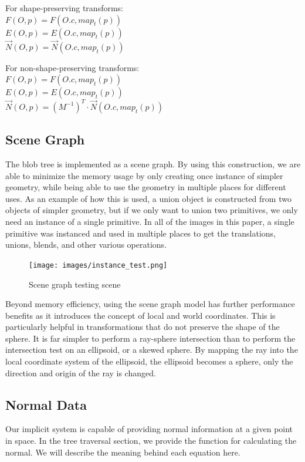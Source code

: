 \documentclass[conference]{acmsiggraph}
\begin{document}
For shape-preserving transforms:\\
$F(O, p) = F(O.c, map_t(p))$\\
$E(O, p) = E(O.c, map_t(p))$\\
$\overrightarrow{N}(O, p) = \overrightarrow{N}(O.c, map_t(p))$

For non-shape-preserving transforms:\\
$F(O, p) = F(O.c, map_t(p))$\\
$E(O, p) = E(O.c, map_t(p))$\\
$\overrightarrow{N}(O, p) = (M^{-1})^T \cdot \overrightarrow{N}(O.c, map_t(p))$

\subsection{Scene Graph}
The blob tree is implemented as a scene graph. By using this construction, we
are able to minimize the memory usage by only creating once instance of simpler
geometry, while being able to use the geometry in multiple places for different
uses. As an example of how this is used, a union object is constructed from two
objects of simpler geometry, but if we only want to union two primitives, we
only need an instance of a single primitive. In all of the images in this
paper, a single primitive was instanced and used in multiple places to get the
translations, unions, blends, and other various operations.

\begin{figure}[htbp]
	\texttt{[image: images/instance\_test.png]}
	\caption{Scene graph testing scene}
	\label{fig:Scenegraph}
\end{figure}

Beyond memory efficiency, using the scene graph model has further performance
benefits as it introduces the concept of local and world coordinates. This is
particularly helpful in transformations that do not preserve the shape of the
sphere. It is far simpler to perform a ray-sphere intersection than to perform
the intersection test on an ellipsoid, or a skewed sphere. By mapping the ray
into the local coordinate system of the ellipsoid, the ellipsoid becomes a
sphere, only the direction and origin of the ray is changed.

\subsection{Normal Data}
Our implicit system is capable of providing normal information at a given point
in space. In the tree traversal section, we provide the function for
calculating the normal. We will describe the meaning behind each equation here.
\end{document}
